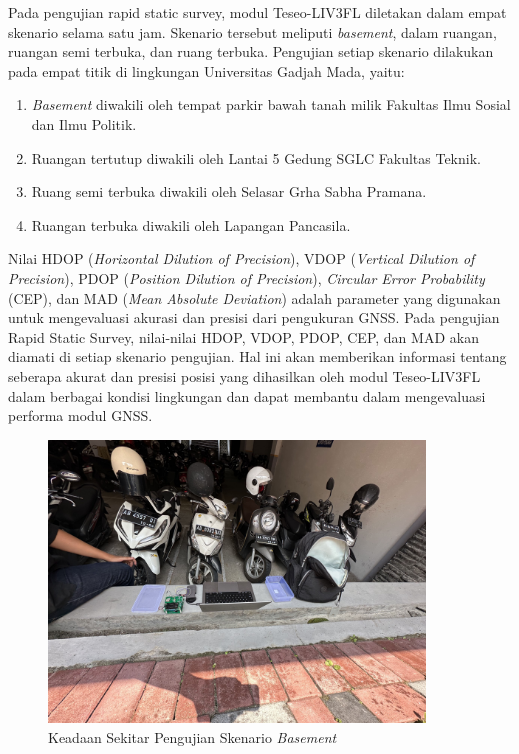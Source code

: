 Pada pengujian rapid static survey, modul Teseo-LIV3FL diletakan dalam empat skenario selama satu jam. Skenario tersebut meliputi \textit{basement}, dalam ruangan, ruangan semi terbuka, dan ruang terbuka. Pengujian setiap skenario dilakukan pada empat titik di lingkungan Universitas Gadjah Mada, yaitu:

\begin{enumerate}
	\item \textit{Basement} diwakili oleh tempat parkir bawah tanah milik Fakultas Ilmu Sosial dan Ilmu Politik.
	\item Ruangan tertutup diwakili oleh Lantai 5 Gedung SGLC Fakultas Teknik.
	\item Ruang semi terbuka diwakili oleh Selasar Grha Sabha Pramana.
	\item Ruangan terbuka diwakili oleh Lapangan Pancasila.
\end{enumerate}

Nilai HDOP (\textit{Horizontal Dilution of Precision}), VDOP (\textit{Vertical Dilution of Precision}), PDOP (\textit{Position Dilution of Precision}), \textit{Circular Error Probability} (CEP), dan MAD (\textit{Mean Absolute Deviation}) adalah parameter yang digunakan untuk mengevaluasi akurasi dan presisi dari pengukuran GNSS. Pada pengujian Rapid Static Survey, nilai-nilai HDOP, VDOP, PDOP, CEP, dan MAD akan diamati di setiap skenario pengujian. Hal ini akan memberikan informasi tentang seberapa akurat dan presisi posisi yang dihasilkan oleh modul Teseo-LIV3FL dalam berbagai kondisi lingkungan dan dapat membantu dalam mengevaluasi performa modul GNSS.

\begin{figure}[H]
	\centering
	\includegraphics[width=10cm]{contents/chapter-4/1-skenario-basement/keadaan.jpg}
	\caption{Keadaan Sekitar Pengujian Skenario \textit{Basement}}
	\label{Fig: basement-keadaan}
\end{figure}

